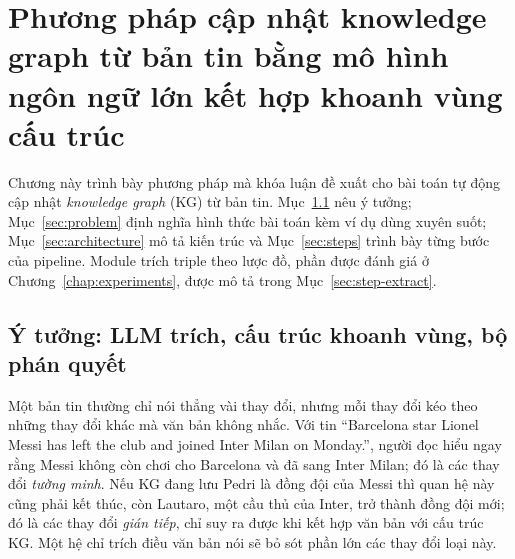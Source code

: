\chapter{Phương pháp cập nhật knowledge graph từ bản tin bằng mô hình ngôn ngữ lớn kết hợp khoanh vùng cấu trúc}\label{chap:method}

\usetikzlibrary{shapes,arrows.meta,positioning,calc,fit,backgrounds,decorations.pathreplacing}
\providecommand{\buoc}[1]{\textup{[#1]}}
\providecommand{\kgr}[1]{\textsf{#1}}
\providecommand{\opk}[1]{\textsf{#1}}
\providecommand{\verd}[1]{{\color{violet!75!black}\textsf{#1}}}
\providecommand{\vfrom}{v_{\mathrm{from}}}
\providecommand{\vuntil}{v_{\mathrm{until}}}

Chương này trình bày phương pháp mà khóa luận đề xuất cho bài toán tự động cập nhật \textit{knowledge graph} (KG) từ bản tin.
Mục~\ref{sec:method-idea} nêu ý tưởng; Mục~\ref{sec:problem} định nghĩa hình thức bài toán kèm ví dụ dùng xuyên suốt; Mục~\ref{sec:architecture} mô tả kiến trúc và Mục~\ref{sec:steps} trình bày từng bước của pipeline.
Module trích triple theo lược đồ, phần được đánh giá ở Chương~\ref{chap:experiments}, được mô tả trong Mục~\ref{sec:step-extract}.

\section{Ý tưởng: LLM trích, cấu trúc khoanh vùng, bộ phán quyết}\label{sec:method-idea}

Một bản tin thường chỉ nói thẳng vài thay đổi, nhưng mỗi thay đổi kéo theo những thay đổi khác mà văn bản không nhắc.
Với tin ``Barcelona star Lionel Messi has left the club and joined Inter Milan on Monday.'', người đọc hiểu ngay rằng Messi không còn chơi cho Barcelona và đã sang Inter Milan; đó là các thay đổi \emph{tường minh}.
Nếu KG đang lưu Pedri là đồng đội của Messi thì quan hệ này cũng phải kết thúc, còn Lautaro, một cầu thủ của Inter, trở thành đồng đội mới; đó là các thay đổi \emph{gián tiếp}, chỉ suy ra được khi kết hợp văn bản với cấu trúc KG.
Một hệ chỉ trích điều văn bản nói sẽ bỏ sót phần lớn các thay đổi loại này.

